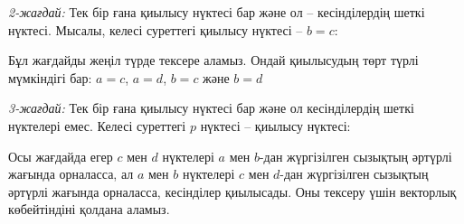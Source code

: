 \textit{2-жағдай:}
Тек бір ғана қиылысу нүктесі бар және ол --
кесінділердің шеткі нүктесі.
Мысалы, келесі суреттегі қиылысу нүктесі -- $b=c$:

\begin{center}
\end{center}

Бұл жағдайды жеңіл түрде тексере аламыз.
Ондай қиылысудың төрт түрлі мүмкіндігі бар: 
$a=c$, $a=d$, $b=c$ және $b=d$


\textit{3-жағдай:}
Тек бір ғана қиылысу нүктесі бар және ол 
кесінділердің шеткі нүктелері емес.
Келесі суреттегі $p$ нүктесі -- қиылысу нүктесі:
\begin{center}
\end{center}

Осы жағдайда егер 
$c$ мен $d$ нүктелері $a$ мен $b$-дан жүргізілген
сызықтың әртүрлі жағында орналасса, ал 
$a$ мен $b$ нүктелері $c$ мен $d$-дан
жүргізілген сызықтың әртүрлі жағында орналасса, кесінділер қиылысады.
Оны тексеру үшін векторлық көбейтіндіні қолдана аламыз.


